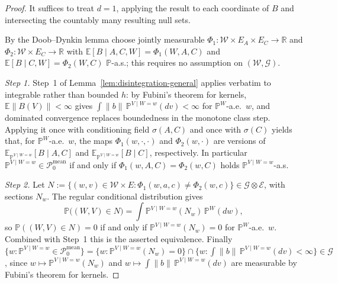 \documentclass[twoside,11pt]{article}
\begin{document}
\begin{proof}
It suffices to treat $d=1$, applying the result to each coordinate of $B$ and
intersecting the countably many resulting null sets.

By the Doob--Dynkin lemma choose jointly measurable
$\Phi_1:\mathcal W\times E_A\times E_C\to\mathbb R$ and
$\Phi_2:\mathcal W\times E_C\to\mathbb R$ with
$\mathbb E[B\mid A,C,W]=\Phi_1(W,A,C)$ and $\mathbb E[B\mid C,W]=\Phi_2(W,C)$
$\mathbb P$-a.s.; this requires no assumption on $(\mathcal W,\mathcal G)$.

\emph{Step 1.} Step~1 of Lemma~\ref{lem:disintegration-general} applies verbatim to integrable
rather than bounded $h$: by Fubini's theorem for kernels,
$\mathbb E\|B(V)\|<\infty$ gives $\int\|b\|\,\mathbb P^{V\mid W=w}(dv)<\infty$ for
$\mathbb P^W$-a.e.\ $w$, and dominated convergence replaces boundedness in the monotone
class step. Applying it once with conditioning field $\sigma(A,C)$ and once with
$\sigma(C)$ yields that, for $\mathbb P^W$-a.e.\ $w$, the maps $\Phi_1(w,\cdot,\cdot)$ and
$\Phi_2(w,\cdot)$ are versions of $\mathbb E_{\mathbb P^{V\mid W=w}}[B\mid A,C]$ and
$\mathbb E_{\mathbb P^{V\mid W=w}}[B\mid C]$, respectively. In particular
$\mathbb P^{V\mid W=w}\in\mathcal P_0^{\mathrm{mean}}$ if and only if
$\Phi_1(w,A,C)=\Phi_2(w,C)$ holds $\mathbb P^{V\mid W=w}$-a.s.

\emph{Step 2.} Let
$N:=\{(w,v)\in\mathcal W\times E:\Phi_1(w,a,c)\neq\Phi_2(w,c)\}\in\mathcal G\otimes\mathcal E$,
with sections $N_w$. The regular conditional distribution gives
\[
  \mathbb P\big((W,V)\in N\big)=\int \mathbb P^{V\mid W=w}(N_w)\,\mathbb P^W(dw),
\]
so $\mathbb P((W,V)\in N)=0$ if and only if $\mathbb P^{V\mid W=w}(N_w)=0$ for
$\mathbb P^W$-a.e.\ $w$. Combined with Step~1 this is the asserted equivalence. Finally
$\{w:\mathbb P^{V\mid W=w}\in\mathcal P_0^{\mathrm{mean}}\}
=\{w:\mathbb P^{V\mid W=w}(N_w)=0\}\cap\{w:\int\|b\|\,\mathbb P^{V\mid W=w}(dv)<\infty\}
\in\mathcal G$,
since $w\mapsto \mathbb P^{V\mid W=w}(N_w)$ and
$w\mapsto\int\|b\|\,\mathbb P^{V\mid W=w}(dv)$ are measurable by Fubini's theorem for
kernels.
\end{proof}
\end{document}

